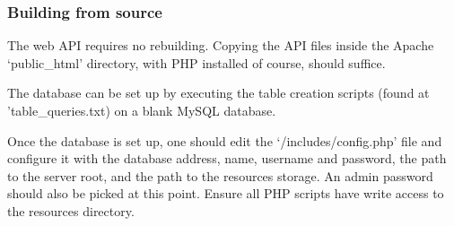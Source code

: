     \subsubsection{Building from source}
        The web API requires no rebuilding. Copying the API files inside the Apache `public\_html' directory, with PHP installed of course, should suffice.
    
        The database can be set up by executing the table creation scripts (found at 'table\_queries.txt) on a blank MySQL database.
    
        Once the database is set up, one should edit the `/includes/config.php' file and configure it with the database address, name, username and password, the path to the server root, and the path to the resources storage. An admin password should also be picked at this point. Ensure all PHP scripts have write access to the resources directory.

